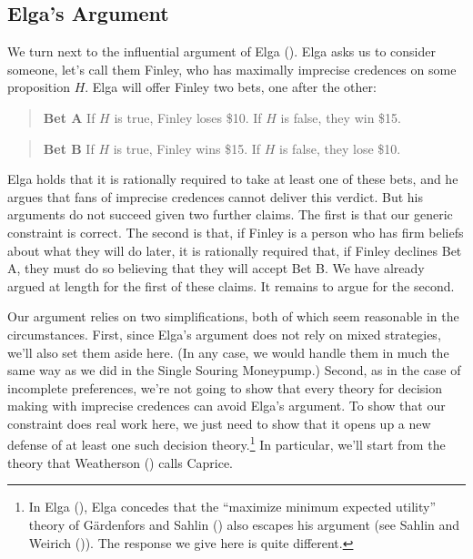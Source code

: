 \documentclass[
  11pt,
  letterpaper,
  DIV=11,
  numbers=noendperiod,
  twoside]{scrartcl}
\begin{document}
\subsection{Elga's Argument}\label{elgas-argument}

We turn next to the influential argument of Elga
(). Elga asks us to consider someone, let's
call them Finley, who has maximally imprecise credences on some
proposition \(H\). Elga will offer Finley two bets, one after the other:

\begin{quote}
\textbf{Bet A} If \(H\) is true, Finley loses \$10. If \(H\) is false,
they win \$15.
\end{quote}

\begin{quote}
\textbf{Bet B} If \(H\) is true, Finley wins \$15. If \(H\) is false,
they lose \$10.
\end{quote}

Elga holds that it is rationally required to take at least one of these
bets, and he argues that fans of imprecise credences cannot deliver this
verdict. But his arguments do not succeed given two further claims. The
first is that our generic constraint is correct. The second is that, if
Finley is a person who has firm beliefs about what they will do later,
it is rationally required that, if Finley declines Bet A, they must do
so believing that they will accept Bet B. We have already argued at
length for the first of these claims. It remains to argue for the
second.

Our argument relies on two simplifications, both of which seem
reasonable in the circumstances. First, since Elga's argument does not
rely on mixed strategies, we'll also set them aside here. (In any case,
we would handle them in much the same way as we did in the Single
Souring Moneypump.) Second, as in the case of incomplete preferences,
we're not going to show that every theory for decision making with
imprecise credences can avoid Elga's argument. To show that our
constraint does real work here, we just need to show that it opens up a
new defense of at least one such decision theory.\footnote{In Elga
  (), Elga concedes that the
  ``maximize minimum expected utility'' theory of Gärdenfors and Sahlin
  () also escapes his
  argument (see Sahlin and Weirich
  ()). The response we give here
  is quite different.} In particular, we'll start from the theory that
Weatherson () calls Caprice.
\end{document}

